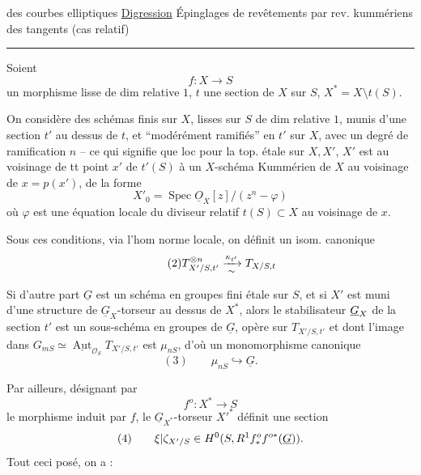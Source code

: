 des courbes elliptiques
\uline{Digression} Épinglages de revêtements par  rev. kummériens des  tangents (cas relatif)

\rule{\linewidth}{0.4pt}

Soient
\[
\tag{1}f:X\longrightarrow S
\]
un morphisme lisse de dim relative $1$, $t$ une section de $X$ sur $S$, $X^*=X\setminus t(S)$.

On considère des schémas  finis sur $X$, lisses sur $S$ de dim relative $1$, munis d'une section $t'$ au dessus de $t$, et ``modérément ramifiés'' en $t'$ sur $X$, avec un degré de ramification $n$ -- ce qui signifie que loc pour la top. étale sur $X,X'$, $X'$ est  au voisinage de tt point $x'$ de $t'(S)$ à un $X$-schéma Kummérien de $X$ au voisinage de $x=p(x')$, de la forme
\[
X'_0=\operatorname{Spec}\underline O_X[z]/(z^n-\varphi)
\]
où $\varphi$ est une équation locale du diviseur relatif $t(S)\subset X$ au voisinage de $x$.

Sous ces conditions, via l'hom norme locale, on définit un isom. canonique
\[
\tag{2}T_{X'/S,t'}^{\otimes n}\xrightarrow[\sim]{\kappa_{t'}}T_{X/S,t}
\]

Si d'autre part $\underline G$ est un schéma en groupes fini étale sur $S$, et si $X'$ est muni d'une structure de $\underline G_X$-torseur au dessus de $X^*$, alors le stabilisateur  $\underline G_{X}$ de la section $t'$ est un sous-schéma en groupes  de $\underline G$,   opère  sur  $T_{X'/S,t'}$ et dont l'image dans  $G_{mS}\simeq\underline{\operatorname{Aut}}_{\mathcal O_S}T_{X'/S,t'}$ est $\mu_{nS}$, d'où un monomorphisme canonique
\[
(3)\qquad \mu_{nS}\hookrightarrow\underline G.
\]

Par ailleurs, désignant par
\[
f^o:X^*\longrightarrow S
\]
le morphisme induit par $f$, le $\underline G_{X^*}$-torseur $X'^*$ définit une section
\[
(4)\qquad \xi|\zeta_{X'/S}\in H^0(S,R^1f^o_*f^{o*}(\underline G)).
\]
Tout ceci posé, on a :

